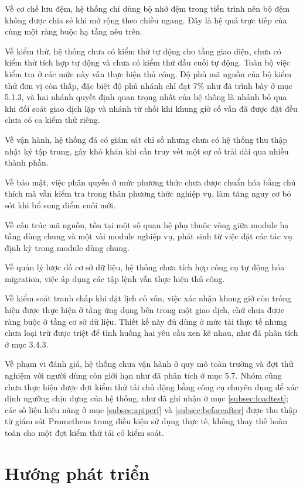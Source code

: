 \documentclass[12pt,a4paper,oneside]{report}
\begin{document}
Về cơ chế lưu đệm, hệ thống chỉ dùng bộ nhớ đệm trong tiến trình nên bộ đệm không được chia sẻ khi mở rộng theo chiều ngang. Đây là hệ quả trực tiếp của cùng một ràng buộc hạ tầng nêu trên.

Về kiểm thử, hệ thống chưa có kiểm thử tự động cho tầng giao diện, chưa có kiểm thử tích hợp tự động và chưa có kiểm thử đầu cuối tự động. Toàn bộ việc kiểm tra ở các mức này vẫn thực hiện thủ công. Độ phủ mã nguồn của bộ kiểm thử đơn vị còn thấp, đặc biệt độ phủ nhánh chỉ đạt 7\% như đã trình bày ở mục 5.1.3, và hai nhánh quyết định quan trọng nhất của hệ thống là nhánh bỏ qua khi đối soát giao dịch lặp và nhánh từ chối khi khung giờ cố vấn đã được đặt đều chưa có ca kiểm thử riêng.

Về vận hành, hệ thống đã có giám sát chỉ số nhưng chưa có hệ thống thu thập nhật ký tập trung, gây khó khăn khi cần truy vết một sự cố trải dài qua nhiều thành phần.

Về bảo mật, việc phân quyền ở mức phương thức chưa được chuẩn hóa bằng chú thích mà vẫn kiểm tra trong thân phương thức nghiệp vụ, làm tăng nguy cơ bỏ sót khi bổ sung điểm cuối mới.

Về cấu trúc mã nguồn, tồn tại một số quan hệ phụ thuộc vòng giữa module hạ tầng dùng chung và một vài module nghiệp vụ, phát sinh từ việc đặt các tác vụ định kỳ trong module dùng chung.

Về quản lý lược đồ cơ sở dữ liệu, hệ thống chưa tích hợp công cụ tự động hóa migration, việc áp dụng các tập lệnh vẫn thực hiện thủ công.

Về kiểm soát tranh chấp khi đặt lịch cố vấn, việc xác nhận khung giờ còn trống hiện được thực hiện ở tầng ứng dụng bên trong một giao dịch, chứ chưa được ràng buộc ở tầng cơ sở dữ liệu. Thiết kế này đủ dùng ở mức tải thực tế nhưng chưa loại trừ được triệt để tình huống hai yêu cầu xen kẽ nhau, như đã phân tích ở mục 3.4.3.

Về phạm vi đánh giá, hệ thống chưa vận hành ở quy mô toàn trường và đợt thử nghiệm với người dùng còn giới hạn như đã phân tích ở mục 5.7. Nhóm cũng chưa thực hiện được đợt kiểm thử tải chủ động bằng công cụ chuyên dụng để xác định ngưỡng chịu đựng của hệ thống, như đã ghi nhận ở mục \ref{subsec:loadtest}; các số liệu hiệu năng ở mục \ref{subsec:apiperf} và \ref{subsec:beforeafter} được thu thập từ giám sát Prometheus trong điều kiện sử dụng thực tế, không thay thế hoàn toàn cho một đợt kiểm thử tải có kiểm soát.

\section{Hướng phát triển}
\end{document}
